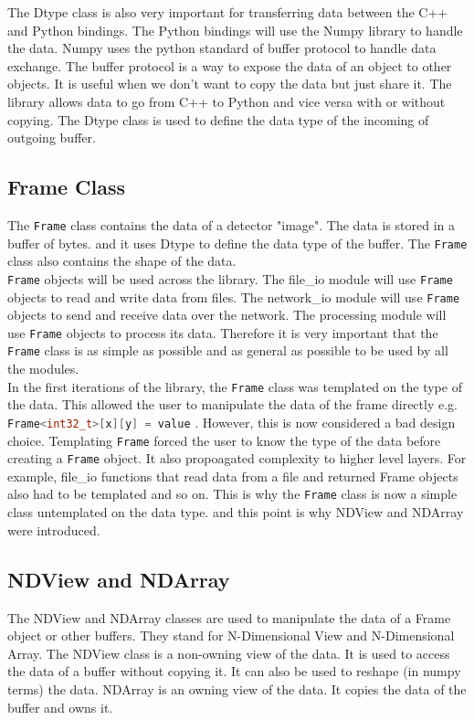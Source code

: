 \documentclass[./chapitre3.tex]{subfiles}
\begin{document}
The Dtype class is also very important for transferring data between the C++ and Python bindings.
The Python bindings will use the Numpy library to handle the data. Numpy uses the python standard
of buffer protocol\cite{bufferprotocol} to handle data exchange. The buffer protocol is a way to expose the data of an object
to other objects. It is useful when we don't want to copy the data but just share it.
The library allows data to go from C++ to Python and vice versa with or without copying.
The Dtype class is used to define the data type of the incoming of outgoing buffer.\\

\subsection{Frame Class}
The \lstinline|Frame| class contains the data of a detector "image". The data is stored in a buffer of bytes.
and it uses Dtype to define the data type of the buffer. The \lstinline|Frame| class also contains the shape
of the data.\\

\lstinline|Frame| objects will be used across the library. The file\_io module will use \lstinline|Frame| objects to read
and write data from files. The network\_io module will use \lstinline|Frame| objects to send and receive data
over the network. The processing module will use \lstinline|Frame| objects to process its data. Therefore
it is very important that the \lstinline|Frame| class is as simple as possible and as general as possible
to be used by all the modules.\\

In the first iterations of the library, the \lstinline|Frame| class was templated on the type of the data.
This allowed the user to manipulate the data of the frame directly e.g. \lstinline[language=C++]|Frame<int32_t>[x][y] = value| .
However, this is now considered a bad design choice. Templating \lstinline|Frame| forced the user to know the type
of the data before creating a \lstinline|Frame| object. It also propoagated complexity to higher level
layers. For example, file\_io functions that read data from a file and returned
Frame objects also had to be templated and so on. This is why the \lstinline|Frame| class is now a simple class untemplated
on the data type. and this point is why NDView and NDArray were introduced.

\subsection{NDView and NDArray}
The NDView and NDArray classes are used to manipulate the data of a Frame object or other buffers. They stand for
N-Dimensional View and N-Dimensional Array. The NDView class is a non-owning view of the data. It is used to access
the data of a buffer without copying it. It can also be used to reshape (in numpy terms) the data. NDArray is an
owning view of the data. It copies the data of the buffer and owns it.\\
\end{document}

